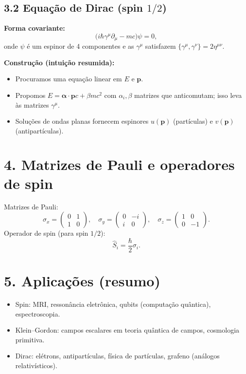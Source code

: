 \documentclass[12pt,a4paper]{article}
\begin{document}
\subsection*{3.2 Equação de Dirac (spin \(1/2\))}

\textbf{Forma covariante:}
\[
\big( i\hbar \gamma^\mu \partial_\mu - mc \big)\psi = 0,
\]
onde \(\psi\) é um espinor de 4 componentes e as \(\gamma^\mu\) satisfazem \(\{\gamma^\mu,\gamma^\nu\}=2\eta^{\mu\nu}\).

\textbf{Construção (intuição resumida):}
\begin{itemize}
  \item Procuramos uma equação linear em \(E\) e \(\mathbf{p}\).
  \item Propomos \(E = \boldsymbol{\alpha}\cdot \mathbf{p}c + \beta mc^2\) com \(\alpha_i,\beta\) matrizes que anticomutam; isso leva às matrizes \(\gamma^\mu\).
  \item Soluções de ondas planas fornecem espinores \(u(\mathbf{p})\) (partículas) e \(v(\mathbf{p})\) (antipartículas).
\end{itemize}

\section*{4. Matrizes de Pauli e operadores de spin}

Matrizes de Pauli:
\[
\sigma_x = \begin{pmatrix}0 & 1\\ 1 & 0\end{pmatrix},\quad
\sigma_y = \begin{pmatrix}0 & -i\\ i & 0\end{pmatrix},\quad
\sigma_z = \begin{pmatrix}1 & 0\\ 0 & -1\end{pmatrix}.
\]
Operador de spin (para spin \(1/2\)):
\[
\hat{S}_i = \frac{\hbar}{2}\sigma_i.
\]

\section*{5. Aplicações (resumo)}

\begin{itemize}
  \item Spin: MRI, ressonância eletrônica, qubits (computação quântica), espectroscopia.
  \item Klein--Gordon: campos escalares em teoria quântica de campos, cosmologia primitiva.
  \item Dirac: elétrons, antipartículas, física de partículas, grafeno (análogos relativísticos).
\end{itemize}
\end{document}
